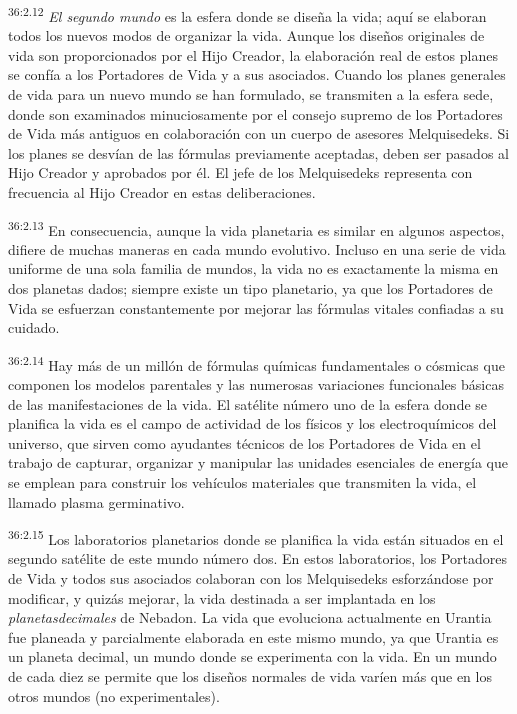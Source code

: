 \par
\textsuperscript{36:2.12} \textit{El segundo mundo} es la esfera donde se diseña la vida; aquí se elaboran todos los nuevos modos de organizar la vida. Aunque los diseños originales de vida son proporcionados por el Hijo Creador, la elaboración real de estos planes se confía a los Portadores de Vida y a sus asociados. Cuando los planes generales de vida para un nuevo mundo se han formulado, se transmiten a la esfera sede, donde son examinados minuciosamente por el consejo supremo de los Portadores de Vida más antiguos en colaboración con un cuerpo de asesores Melquisedeks. Si los planes se desvían de las fórmulas previamente aceptadas, deben ser pasados al Hijo Creador y aprobados por él. El jefe de los Melquisedeks representa con frecuencia al Hijo Creador en estas deliberaciones.

\par
\textsuperscript{36:2.13} En consecuencia, aunque la vida planetaria es similar en algunos aspectos, difiere de muchas maneras en cada mundo evolutivo. Incluso en una serie de vida uniforme de una sola familia de mundos, la vida no es exactamente la misma en dos planetas dados; siempre existe un tipo planetario, ya que los Portadores de Vida se esfuerzan constantemente por mejorar las fórmulas vitales confiadas a su cuidado.

\par
\textsuperscript{36:2.14} Hay más de un millón de fórmulas químicas fundamentales o cósmicas que componen los modelos parentales y las numerosas variaciones funcionales básicas de las manifestaciones de la vida. El satélite número uno de la esfera donde se planifica la vida es el campo de actividad de los físicos y los electroquímicos del universo, que sirven como ayudantes técnicos de los Portadores de Vida en el trabajo de capturar, organizar y manipular las unidades esenciales de energía que se emplean para construir los vehículos materiales que transmiten la vida, el llamado plasma germinativo.

\par
\textsuperscript{36:2.15} Los laboratorios planetarios donde se planifica la vida están situados en el segundo satélite de este mundo número dos. En estos laboratorios, los Portadores de Vida y todos sus asociados colaboran con los Melquisedeks esforzándose por modificar, y quizás mejorar, la vida destinada a ser implantada en los \textit{planetasdecimales} de Nebadon. La vida que evoluciona actualmente en Urantia fue planeada y parcialmente elaborada en este mismo mundo, ya que Urantia es un planeta decimal, un mundo donde se experimenta con la vida. En un mundo de cada diez se permite que los diseños normales de vida varíen más que en los otros mundos (no experimentales).

